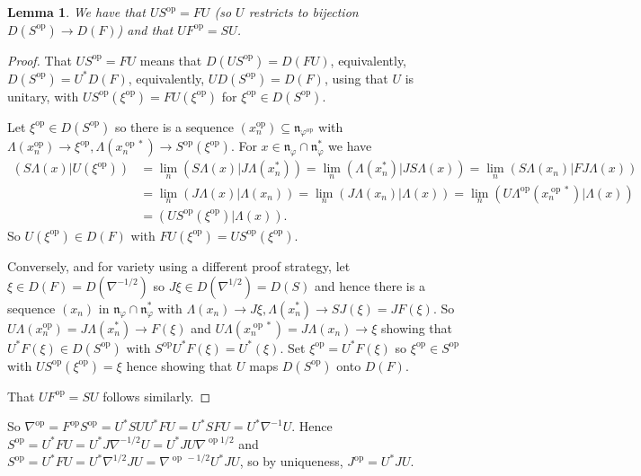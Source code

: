 \documentclass[a4paper,11pt]{article}
\theoremstyle{plain}
\newtheorem{lemma}[proposition]{Lemma}
\theoremstyle{remark}
\newcommand{\mf}[1]{\mathfrak{#1}}
\newcommand{\op}{{\operatorname{op}}}
\begin{document}
\begin{lemma}
We have that $US^\op = FU$ (so $U$ restricts to bijection $D(S^\op) \to D(F)$) and that $UF^\op = SU$.
\end{lemma}
\begin{proof}
That $US^\op = FU$ means that $D(US^\op) = D(FU)$, equivalently, $D(S^\op) = U^*D(F)$, equivalently, $U D(S^\op) = D(F)$, using that $U$ is unitary, with $US^\op(\xi^\op) = FU(\xi^\op)$ for $\xi^\op \in D(S^\op)$.

Let $\xi^\op\in D(S^\op)$ so there is a sequence $(x_n^\op) \subseteq \mf n_{\varphi^\op}$ with $\Lambda(x_n^\op) \to \xi^\op, \Lambda(x_n^{\op *}) \to S^\op(\xi^\op)$.  For $x\in\mf n_\varphi \cap\mf n_\varphi^*$ we have
\begin{align*}
(S\Lambda(x)|U(\xi^\op))
&= \lim_n (S\Lambda(x)|J\Lambda(x_n^*))
= \lim_n (\Lambda(x_n^*)|JS\Lambda(x))
= \lim_n (S\Lambda(x_n)|FJ\Lambda(x)) \\
&= \lim_n (J\Lambda(x)|\Lambda(x_n))
= \lim_n (J\Lambda(x_n)|\Lambda(x))
= \lim_n (U\Lambda^\op(x_n^{\op *}) | \Lambda(x) ) \\
&= (US^\op(\xi^\op)|\Lambda(x)).
\end{align*}
So $U(\xi^\op) \in D(F)$ with $FU(\xi^\op) = US^\op(\xi^\op)$.

Conversely, and for variety using a different proof strategy, let $\xi\in D(F) = D(\nabla^{-1/2})$ so $J\xi \in D(\nabla^{1/2}) = D(S)$ and hence there is a sequence $(x_n)$ in $\mf n_\varphi \cap\mf n_\varphi^*$ with $\Lambda(x_n) \to J\xi, \Lambda(x_n^*) \to SJ(\xi) = JF(\xi)$.  So $U\Lambda(x_n^\op) = J\Lambda(x_n^*) \to F(\xi)$ and $U\Lambda(x_n^{\op *}) = J\Lambda(x_n) \to \xi$ showing that $U^*F(\xi) \in D(S^\op)$ with $S^\op U^*F(\xi) = U^*(\xi)$.  Set $\xi^\op = U^*F(\xi)$ so $\xi^\op \in S^\op$ with $US^\op(\xi^\op) = \xi$ hence showing that $U$ maps $D(S^\op)$ onto $D(F)$.

That $UF^\op = SU$ follows similarly.
\end{proof}

So $\nabla^\op = F^\op S^\op = U^*S U U^*FU = U^* SF U = U^* \nabla^{-1} U$.  Hence $S^\op = U^* F U = U^* J \nabla^{-1/2} U = U^* J U \nabla^{\op 1/2}$ and $S^\op = U^*FU = U^* \nabla^{1/2} J U = \nabla^{\op\, -1/2} U^*JU$, so by uniqueness, $J^\op = U^*JU$.
\end{document}
